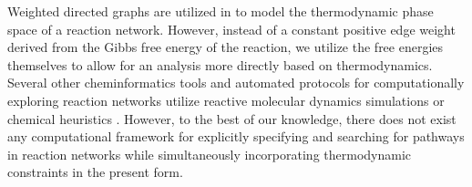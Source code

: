 Weighted directed graphs are utilized in \cite{synthesis_planning_CRN_thermodynamics} to model the thermodynamic phase space of a reaction network.
However, instead of a constant positive edge weight derived from the Gibbs free energy of the reaction,
we utilize the free energies themselves to allow for an analysis more directly based on thermodynamics.
Several other cheminformatics tools and automated protocols for computationally exploring reaction networks utilize reactive molecular dynamics simulations \cite{CRN_MD_tool1, CRN_MD_tool2, CRN_MD_tool3} or chemical heuristics \cite{CRN_kin_tool1, CRN_kin_tool2, CRN_kin_tool3, pickaxe_CRN_analyzer}.
However, to the best of our knowledge, there does not exist any computational framework for explicitly specifying and searching for pathways in reaction networks while simultaneously incorporating thermodynamic constraints in the present form. 

